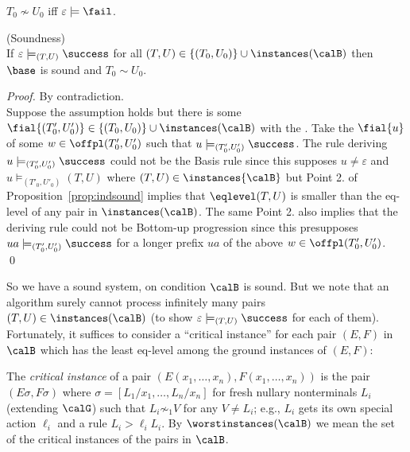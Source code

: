 \documentclass[12pt]{article}
\begin{document}
\begin{cor}
$T_0\not\sim U_0$ iff $\varepsilon \models  \fail$.
\end{cor}



\begin{prop}\label{prop:infsoundness}(Soundness)
\\
If $\varepsilon\models_{(T,U)}\success$ for all
$(T,U)\in\{(T_0,U_0)\}\cup \instances(\calB)$
then $\base$ is sound and $T_0\sim U_0$.
\end{prop}

\begin{proof}
By contradiction.
\\
Suppose the assumption holds but there is some
$\fial{(T'_0,U'_0)}\in\{(T_0,U_0)\}\cup \instances(\calB)$
with the {}.
Take the {} $\fial{u}$ 
of some $w\in\offpl(T'_0,U'_0)$ such that 
$u\models_{(T'_0,U'_0)}\success$. 
The rule deriving $u\models_{(T'_0,U'_0)}\success$
could not be the Basis rule since
this supposes $u\neq\varepsilon$ and $u\models_{(T'_0,U'_0)}(T,U)$
where $(T,U)\in\instances{\calB}$ but 
 Point 2. of Proposition~\ref{prop:indsound} implies that
$\eqlevel(T,U)$ is smaller than the eq-level of any pair in
$\instances(\calB)$.
The same Point 2. also implies that 
the deriving rule could not be Bottom-up
progression since this presupposes $ua\models_{(T'_0,U'_0)}\success$
for 
a longer prefix $ua$ of the above $w\in\offpl(T'_0,U'_0)$.
\qed
\end{proof}

\noindent
So we have a sound system, on condition $\calB$ is sound.
But we note that an algorithm surely cannot process infinitely many
pairs  $(T,U)\in \instances(\calB)$ (to show 
$\varepsilon\models_{(T,U)}\success$ for each of them).
Fortunately, it suffices to consider a ``critical instance'' for each pair
$(E,F)$ in
$\calB$ which has the least eq-level among
the ground instances of $(E,F)$:

\begin{defn}
The \emph{critical instance} of a pair 
 $(E(x_1,\dots,x_n),F(x_1,\dots,x_n))$ is the pair 
  $(E\sigma,F\sigma)$ where $\sigma=[L_1/x_1,\dots,L_n/x_n]$
for fresh 
nullary nonterminals $L_i$ (extending $\calG$) such that 
$L_i\not\sim_1 V$ for any $V\neq L_i$; e.g., $L_i$ gets its own
special action $\ell_i$ and a rule $L_i\gt{\ell_i}L_i$.
By $\worstinstances(\calB)$ we mean the set of the critical instances of
the pairs in $\calB$. 
\end{defn}
\end{document}
